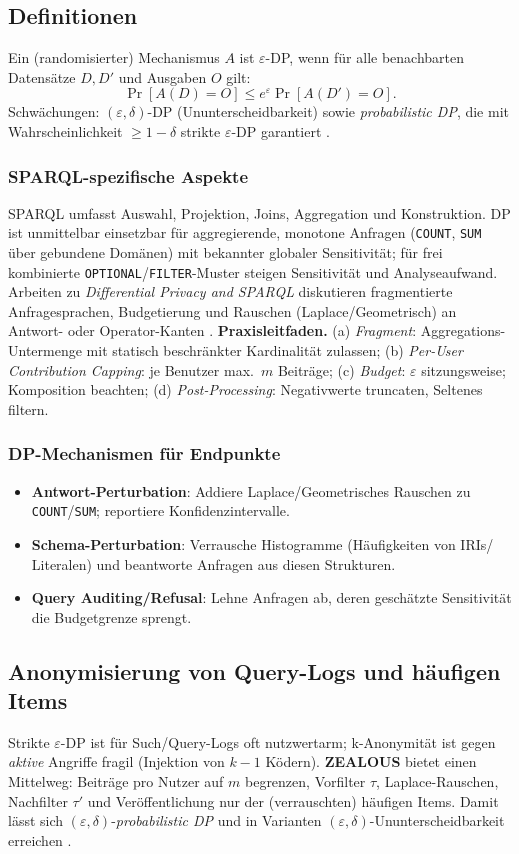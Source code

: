 \subsection{Definitionen}
Ein (randomisierter) Mechanismus $A$ ist $\varepsilon$-DP, wenn für alle benachbarten Datensätze $D,D'$ und Ausgaben $O$ gilt:
\[
\Pr[A(D)=O]\le e^{\varepsilon}\Pr[A(D')=O].
\]
Schwächungen: $(\varepsilon,\delta)$-DP (Ununterscheidbarkeit) sowie \emph{probabilistic DP}, die mit Wahrscheinlichkeit $\ge 1-\delta$ strikte $\varepsilon$-DP garantiert \cite{GoetzZealous}.

\subsubsection{SPARQL-spezifische Aspekte}
SPARQL umfasst Auswahl, Projektion, Joins, Aggregation und Konstruktion. DP ist unmittelbar einsetzbar für aggregierende, monotone Anfragen (\texttt{COUNT}, \texttt{SUM} über gebundene Domänen) mit bekannter globaler Sensitivität; für frei kombinierte \texttt{OPTIONAL}/\texttt{FILTER}-Muster steigen Sensitivität und Analyseaufwand. Arbeiten zu \emph{Differential Privacy and SPARQL} diskutieren fragmentierte Anfragesprachen, Budgetierung und Rauschen (Laplace/Geometrisch) an Antwort- oder Operator-Kanten \cite{builaranda-dp-sparql}. 
\textbf{Praxisleitfaden.} 
(a) \emph{Fragment}: Aggregations-Untermenge mit statisch beschränkter Kardinalität zulassen; 
(b) \emph{Per-User Contribution Capping}: je Benutzer max.\ $m$ Beiträge; 
(c) \emph{Budget}: $\varepsilon$ sitzungsweise; Komposition beachten; 
(d) \emph{Post-Processing}: Negativwerte truncaten, Seltenes filtern.

\subsubsection{DP-Mechanismen für Endpunkte}
\begin{itemize}
  \item \textbf{Antwort-Perturbation}: Addiere Laplace/Geometrisches Rauschen zu \texttt{COUNT}/\texttt{SUM}; reportiere Konfidenzintervalle.
  \item \textbf{Schema-Perturbation}: Verrausche Histogramme (Häufigkeiten von IRIs/ Literalen) und beantworte Anfragen aus diesen Strukturen.
  \item \textbf{Query Auditing/Refusal}: Lehne Anfragen ab, deren geschätzte Sensitivität die Budgetgrenze sprengt.
\end{itemize}

\subsection{Anonymisierung von Query-Logs und häufigen Items}
Strikte $\varepsilon$-DP ist für Such/Query-Logs oft nutzwertarm; k-Anonymität ist gegen \emph{aktive} Angriffe fragil (Injektion von $k\!-\!1$ Ködern). \textbf{ZEALOUS} bietet einen Mittelweg: Beiträge pro Nutzer auf $m$ begrenzen, Vorfilter $\tau$, Laplace-Rauschen, Nachfilter $\tau'$ und Veröffentlichung nur der (verrauschten) häufigen Items. Damit lässt sich $(\varepsilon,\delta)$-\emph{probabilistic DP} und in Varianten $(\varepsilon,\delta)$-Ununterscheidbarkeit erreichen \cite{GoetzZealous}. 
